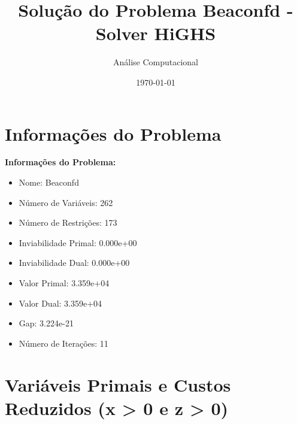 \documentclass[12pt]{article}
\title{Solução do Problema Beaconfd - Solver HiGHS}
\author{Análise Computacional}
\date{\today}
\begin{document}
\maketitle

\section{Informações do Problema}

\textbf{Informações do Problema:}
\begin{itemize}
\item Nome: Beaconfd
\item Número de Variáveis: 262
\item Número de Restrições: 173
\item Inviabilidade Primal: 0.000e+00
\item Inviabilidade Dual: 0.000e+00
\item Valor Primal: 3.359e+04
\item Valor Dual: 3.359e+04
\item Gap: 3.224e-21
\item Número de Iterações: 11
\end{itemize}


\section{Variáveis Primais e Custos Reduzidos (x > 0 e z > 0)}
\end{document}

